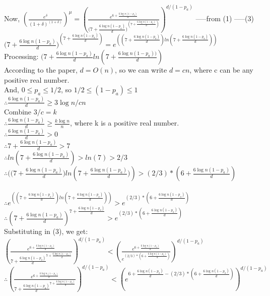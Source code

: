 \documentclass{article}
\begin{document}
Now, 
$(\frac{e^\delta}{(1+\delta)^(1+\delta)})^\mu=
{(\frac{e^{6 + \frac{6\log n(1-p_a)}{d}}}{({7 + \frac{6\log n(1-p_a)}{d})}^{(7 + \frac{6\log n(1-p_a)}{d})}})}^{d/(1-p_a)}$ -----from (1) -----(3) \\
${({7 + \frac{6\log n(1-p_a)}{d})}^{(7 + \frac{6\log n(1-p_a)}{d})}} = e^{(({7 + \frac{6\log n(1-p_a)}{d}})ln({7 + \frac{6\log n(1-p_a)}{d}}))}$\\
Processing:
${(7 + \frac{6\log n(1-p_a)}{d}}ln({7 + \frac{6\log n(1-p_a))}{d}}) $\\
According to the paper, $d=O(n)$, so we can write $d=cn$, where c can be any positive real number.\\
And, $0 \leq p_a \leq 1/2$, so $1/2 \leq (1-p_a) \leq 1$\\
$\therefore \frac{6\log n(1-p_a)}{d} \geq 3\log n/cn$\\
Combine $3/c = k$\\
$\therefore \frac{6\log n(1-p_a)}{d} \geq \frac{k\log n}{n}$, where k is a positive real number.\\
$\therefore \frac{6\log n(1-p_a)}{d} > 0$\\
$\therefore 7 + \frac{6\log n(1-p_a)}{d} > 7$\\
$\therefore ln(7 + \frac{6\log n(1-p_a)}{d}) > ln(7) > 2/3$\\
$\therefore {((7 + \frac{6\log n(1-p_a)}{d}})ln({7 + \frac{6\log n(1-p_a)}{d})}) > (2/3)*(6 + \frac{6\log n(1-p_a)}{d})$\\
\\
$\therefore e^{(({7 + \frac{6\log n(1-p_a)}{d}})ln({7 + \frac{6\log n(1-p_a)}{d}}))} > e^{(2/3)*(6 + \frac{6\log n(1-p_a)}{d})}$\\
$\therefore ({7 + \frac{6\log n(1-p_a)}{d}})^{7 + \frac{6\log n(1-p_a)}{d}} > e^{(2/3)*(6 + \frac{6\log n(1-p_a)}{d})}$\\
Substituting in (3), we get:\\
${(\frac{e^{6 + \frac{6\log n(1-p_a)}{d}}}{{7 + \frac{6\log n(1-p_a)}{d}}^{7 + \frac{6\log n(1-p_a)}{d}}})}^{d/(1-p_a)} <(\frac{e^{6 + \frac{6\log n(1-p_a)}{d}}}{e^{(2/3)*(6 + \frac{6\log n(1-p_a)}{d})}})^{d/(1-p_a)}$\\
$\therefore {(\frac{e^{6 + \frac{6\log n(1-p_a)}{d}}}{{7 + \frac{6\log n(1-p_a)}{d}}^{7 + \frac{6\log n(1-p_a)}{d}}})}^{d/(1-p_a)} <(e^{{6 + \frac{6\log n(1-p_a)}{d}}-{(2/3)*(6 + \frac{6\log n(1-p_a)}{d})}})^{d/(1-p_a)}$\\
\end{document}
